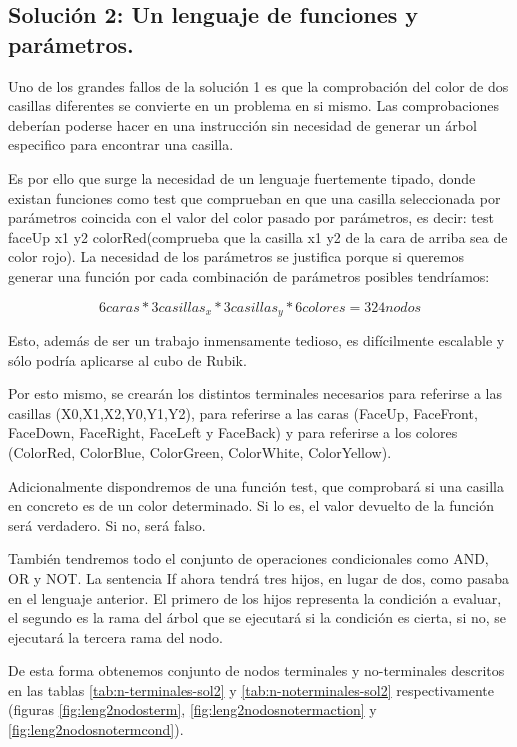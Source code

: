 \clearpage


\subsection{Solución 2: Un lenguaje de
funciones y parámetros.}\label{subsec:solucion2}

Uno de los grandes fallos de la solución 1 es que la comprobación del color de
dos casillas diferentes se convierte en un problema en si mismo. Las
comprobaciones deberían poderse hacer en una instrucción sin necesidad de generar
un árbol especifico para encontrar una casilla.

Es por ello que surge la necesidad de un lenguaje fuertemente tipado, donde
existan funciones como test que comprueban en que una casilla seleccionada por
parámetros coincida con el valor del color pasado por parámetros, es decir:
test faceUp x1 y2 colorRed(comprueba que la casilla x1 y2 de la cara de
arriba sea de color rojo). La necesidad de los parámetros se justifica porque si queremos
generar una función por cada combinación de parámetros posibles tendríamos:

\begin{equation}
   6 caras * 3 casillas_x * 3 casillas_y * 6 colores = 324 nodos
\end{equation}

Esto, además de ser un trabajo inmensamente tedioso, es difícilmente escalable y
sólo podría aplicarse al cubo de Rubik.

Por esto mismo, se crearán los distintos terminales necesarios para referirse a
las casillas (X0,X1,X2,Y0,Y1,Y2), para referirse a las caras (FaceUp, FaceFront,
FaceDown, FaceRight, FaceLeft y FaceBack) y para referirse a los colores
(ColorRed, ColorBlue, ColorGreen, ColorWhite, ColorYellow).

Adicionalmente dispondremos de una función test, que comprobará si una casilla
en concreto es de un color determinado. Si lo es, el valor devuelto de la función
será verdadero. Si no, será falso.

También tendremos todo el conjunto de operaciones condicionales como AND, OR y
NOT. La sentencia If ahora tendrá tres hijos, en lugar de dos, como pasaba en el
lenguaje anterior. El primero de los hijos representa la condición a evaluar, el
segundo es la rama del árbol que se ejecutará si la condición es cierta, si no,
se ejecutará la tercera rama del nodo.

De esta forma obtenemos conjunto de nodos terminales y no-terminales descritos
en las tablas \ref{tab:n-terminales-sol2} y \ref{tab:n-noterminales-sol2}
respectivamente (figuras \ref{fig:leng2nodosterm}, 
\ref{fig:leng2nodosnotermaction} y \ref{fig:leng2nodosnotermcond}).

